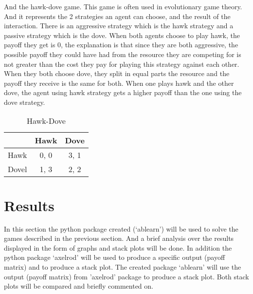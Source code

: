 And the hawk-dove game. This game is often used in  evolutionary game theory. And it represents the 2 strategies an agent can choose,  and the result of the interaction. There is an aggressive strategy which is the hawk strategy and a passive strategy which is the dove. When both agents choose to play hawk, the payoff they get is 0, the explanation is that since they are both aggressive, the possible payoff they could have had from the resource they are competing for is not greater than the cost they pay for playing this strategy against each other. When they both choose dove, they split in equal parts the resource and the payoff they receive is the same for both. When one plays hawk and the other dove, the agent using hawk strategy gets a higher payoff than the one using the dove strategy.    

\begin{table}[h]
\begin{center}
\begin{tabular}{|l|c|c|}
\hline
 & Hawk & Dove \\ 
\hline
Hawk & 0, 0 & 3, 1\\
\hline
 Dovel & 1, 3 & 2, 2\\
\hline
\end{tabular}
\end{center}
\caption{Hawk-Dove}
\label{tab:hdtag}
\end{table}

\newpage
\section{Results}
In this section the python package created (`ablearn') will be used to solve the games described in the previous section. And a brief analysis over the results displayed in the form of graphs and stack plots will be done. In addition the python package `axelrod' will be used to produce a specific output (payoff matrix) and to produce a stack plot. The created package `ablearn'  will use the output (payoff matrix) from 'axelrod' package to produce a stack plot. Both stack plots will be compared and briefly commented on.  

